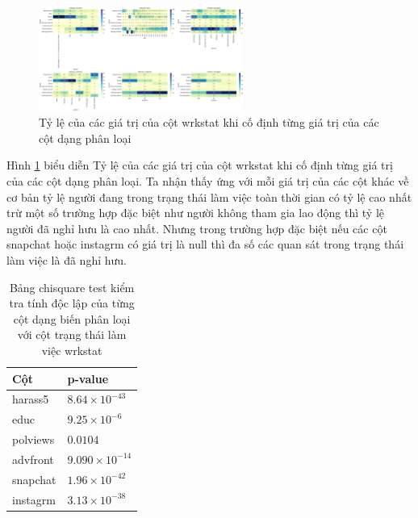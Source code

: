 \begin{figure}[H]
    \centering
    \includegraphics[width=0.6\textwidth]{figures/Thanh/Data_Analysis/With_null_percentage_matrix_categorical_wrkstat_condition_on_columns.png}
    \caption{Tỷ lệ của các giá trị của cột wrkstat khi cố định từng giá trị của các cột dạng phân loại}
    \label{fig:With_null_percentage_matrix_categorical_wrkstat_condition_on_columns}
\end{figure}

Hình \ref{fig:With_null_percentage_matrix_categorical_wrkstat_condition_on_columns} biểu diễn Tỷ lệ của các giá trị của cột wrkstat khi cố định từng giá trị của các cột dạng phân loại.
Ta nhận thấy ứng với mỗi giá trị của các cột khác về cơ bản tỷ lệ người đang trong trạng thái làm việc toàn thời gian có tỷ lệ cao nhất trừ một số trường hợp đặc biệt như người không tham gia lao động thì tỷ lệ người đã nghỉ hưu là cao nhất.
Nhưng trong trường hợp đặc biệt nếu các cột snapchat hoặc instagrm có giá trị là null thì đa số các quan sát trong trạng thái làm việc là đã nghỉ hưu.

\begin{table}[ht]
    \centering
    \begin{tabular}{|l|l|}
    \hline
    Cột & p-value \\
    \hline
    harass5 & $8.64 \times 10^{-43}$ \\
    \hline
    educ & $9.25 \times 10^{-6}$ \\
    \hline
    polviews & $0.0104$ \\
    \hline
    advfront & $9.090 \times 10^{-14}$ \\
    \hline
    snapchat & $1.96 \times 10^{-42}$ \\
    \hline
    instagrm & $3.13 \times 10^{-38}$ \\
    \hline
    \end{tabular}
    \caption{Bảng chisquare test kiểm tra tính độc lập của từng cột dạng biến phân loại với cột trạng thái làm việc wrkstat}
    \label{tab:With_null_chisquare_test}
\end{table}

